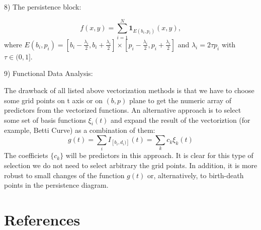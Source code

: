 \documentclass{article}
\begin{document}
8) The persistence block:

$$
f(x,y)=\sum_{i=1}^N \mathbf 1_{E(b_i,p_i)}(x,y),
$$
where $E(b_i,p_i)=[b_i-\frac{\lambda_i}{2},b_i+\frac{\lambda_i}{2}]\times [p_i-\frac{\lambda_i}{2},p_i+\frac{\lambda_i}{2}]$ and $\lambda_i=2\tau p_i$ with $\tau\in (0,1]$.

9) Functional Data Analysis:

The drawback of all listed above vectorization methods is that we have to choose some grid points on t axis or on $(b,p)$ plane to get the numeric array of predictors from the vectorized functions. An alternative approach is to select some set of basis functions $\xi_i(t)$ and expand the result of the vectoriztion (for example, Betti Curve) as a combination of them:
$$
g(t) = \sum_i I_{[b_i,d_i)]}(t) = \sum_k c_k \xi_k(t)
$$
The coefficiets $\{c_k\}$ will be predictors in this approach. It is clear for this type of selection we do not need to select arbitrary the grid points. In addition, it is more robust to small changes of the function $g(t)$ or, alternatively, to birth-death points in the persistence diagram.

\section{References}
\end{document}
